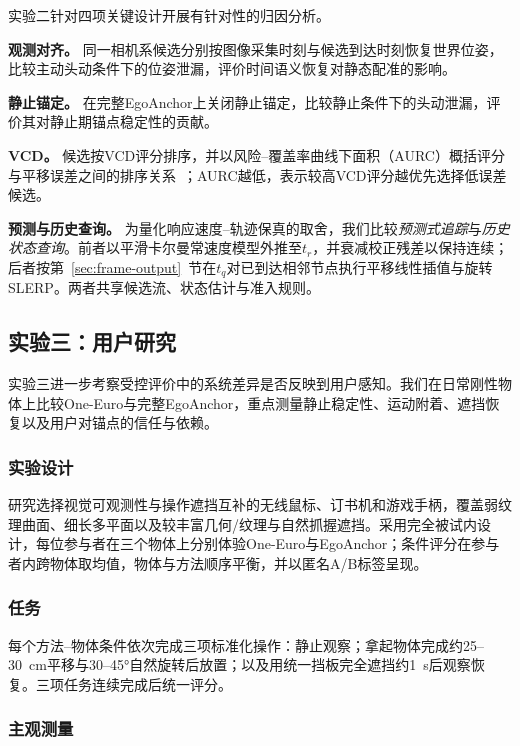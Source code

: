 \documentclass[review]{vgtc}
\begin{document}
实验二针对四项关键设计开展有针对性的归因分析。

\textbf{观测对齐。}
同一相机系候选分别按图像采集时刻与候选到达时刻恢复世界位姿，比较主动头动条件下的位姿泄漏，评价时间语义恢复对静态配准的影响。

\textbf{静止锚定。}
在完整EgoAnchor上关闭静止锚定，比较静止条件下的头动泄漏，评价其对静止期锚点稳定性的贡献。

\textbf{VCD。}
候选按VCD评分排序，并以风险--覆盖率曲线下面积（AURC）概括评分与平移误差之间的排序关系~\cite{riskcontrolled2020,ding2020uncertainty}；AURC越低，表示较高VCD评分越优先选择低误差候选。

\textbf{预测与历史查询。}
为量化响应速度--轨迹保真的取舍，我们比较\emph{预测式追踪}与\emph{历史状态查询}。前者以平滑卡尔曼常速度模型外推至$t_r$，并衰减校正残差以保持连续；后者按第~\ref{sec:frame-output}~节在$t_q$对已到达相邻节点执行平移线性插值与旋转SLERP。两者共享候选流、状态估计与准入规则。

\subsection{实验三：用户研究}\label{sec:exp3-design}

实验三进一步考察受控评价中的系统差异是否反映到用户感知。我们在日常刚性物体上比较One-Euro与完整EgoAnchor，重点测量静止稳定性、运动附着、遮挡恢复以及用户对锚点的信任与依赖。

\subsubsection{实验设计}

研究选择视觉可观测性与操作遮挡互补的无线鼠标、订书机和游戏手柄，覆盖弱纹理曲面、细长多平面以及较丰富几何/纹理与自然抓握遮挡。采用完全被试内设计，每位参与者在三个物体上分别体验One-Euro与EgoAnchor；条件评分在参与者内跨物体取均值，物体与方法顺序平衡，并以匿名A/B标签呈现。

\subsubsection{任务}

每个方法--物体条件依次完成三项标准化操作：静止观察；拿起物体完成约25--30~cm平移与30--45°自然旋转后放置；以及用统一挡板完全遮挡约1~s后观察恢复。三项任务连续完成后统一评分。

\subsubsection{主观测量}
\end{document}
